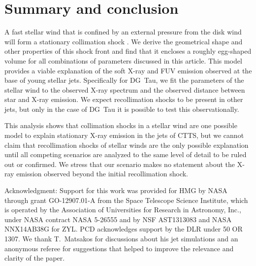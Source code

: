 \section{Summary and conclusion}
\label{sect:summary}
A fast stellar wind that is confined by an external pressure from the disk wind will form a stationary collimation shock \citep{2012MNRAS.422.2282K}. We derive the geometrical shape and other properties of this shock front and find that it encloses a roughly egg-shaped volume for all combinations of parameters discussed in this article. This model provides a viable explanation of the soft X-ray and FUV emission observed at the base of young stellar jets. Specifically for DG~Tau, we fit the parameters of the stellar wind to the observed X-ray spectrum and the observed distance between star and X-ray emission.  We expect recollimation shocks to be present in other jets, but only in the case of DG~Tau it is possible to test this observationally.

This analysis shows that collimation shocks in a stellar wind are one possible model to explain stationary X-ray emission in the jets of CTTS, but we cannot claim that recollimation shocks of stellar winds are the only possible explanation until all competing scenarios are analyzed to the same level of detail to be ruled out or confirmed. We stress that our scenario makes no statement about the X-ray emission observed beyond the initial recollimation shock.




Acknowledgment: 
Support for this work was provided for HMG by NASA through grant GO-12907.01-A from the Space Telescope Science Institute, which is operated by the Association of Universities for Research in Astronomy, Inc., under NASA contract NASA 5-26555 and by NSF AST1313083 and NASA NNX14AB38G for ZYL. PCD acknowledges support by the DLR under 50 OR 1307. We thank T.~Matsakos for discussions about his jet simulations and an anonymous referee for suggestions that helped to improve the relevance and clarity of the paper.
